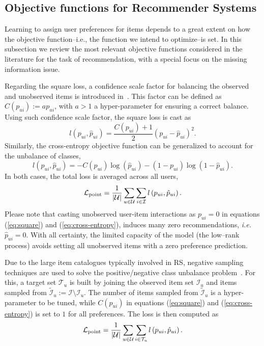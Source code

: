 \subsection{Objective functions for Recommender Systems}\label{subsec:losses}

Learning to assign user preferences for items depends to a great extent on how the objective function--i.e., the function we intend to optimize--is set. In this subsection we review the most relevant objective functions considered in the literature for the task of recommendation, with a special focus on the missing information issue.

Regarding the square loss, a confidence scale factor for balancing the observed and unobserved items is introduced in~\cite{HuKoren:2008:CF_implicit}.
This factor can be defined as $C(p_{ui}):=a p_{ui}$, with $a>1$ a hyper-parameter for ensuring a correct balance. 
Using such confidence scale factor, the square loss is cast as
\begin{equation}\label{eq:square}
l(p_{ui},\hat{p}_{ui})=\frac{C(p_{ui})+1}{2}\left(p_{ui}-\hat{p}_{ui}\right)^2.
\end{equation}
Similarly, the cross-entropy objective function can be generalized to account for the unbalance of classes, 
\begin{equation}\label{eq:cross-entropy}
l\left(p_{ui},\hat{p}_{ui}\right) = 
- C\left(p_{ui}\right)\log\left(\hat{p}_{ui}\right)  
- \left(1-p_{ui}\right)\log\left(1-\hat{p}_{ui}\right).
\end{equation}
In both cases, the total loss is averaged across all users, 
\begin{equation}\label{eq:point-wise_no_sampling}
\mathcal{L}_{\rm point}=\frac{1}{|\mathcal{U}|}\sum_{u\in \mathcal{U}} 
\sum_{i\in\mathcal{I}} l\left(p_{ui},\hat{p}_{ui}\right).
\end{equation}
Please note that casting unobserved user-item interactions as  $p_{ui}=0$ in equations (\ref{eq:square}) and (\ref{eq:cross-entropy}), induces many zero recommendations, \emph{i.e.} $\hat{p}_{ui}=0$. With all certainty, the limited capacity of the model (the low--rank process) avoids setting all unobserved items with a zero preference prediction. 

Due to the large item catalogues typically involved in RS, negative sampling techniques are used to solve  the positive/negative class unbalance problem~\cite{Pan:2008:OCCF, Wu:2016:CDAE-topN}. For this, a target set $\mathcal{T}_u$ is built by joining the observed item set $\mathcal{I}_u$ and items sampled from $\mathcal{\tilde{I}}_u:=\mathcal{I} \setminus \mathcal{I}_u$. The number of items sampled from $\mathcal{\tilde{I}}_u$ is a hyper-parameter to be tuned, while $C(p_{ui})$ in equations (\ref{eq:square}) and (\ref{eq:cross-entropy}) is set to $1$  for all preferences. The loss is then computed as 
\begin{equation}\label{eq:point-wise}
\mathcal{L}_{\rm point}=\frac{1}{|\mathcal{U}|}\sum_{u\in \mathcal{U}} 
\sum_{i\in\mathcal{T}_u} l\left(p_{ui},\hat{p}_{ui}\right).
\end{equation}


